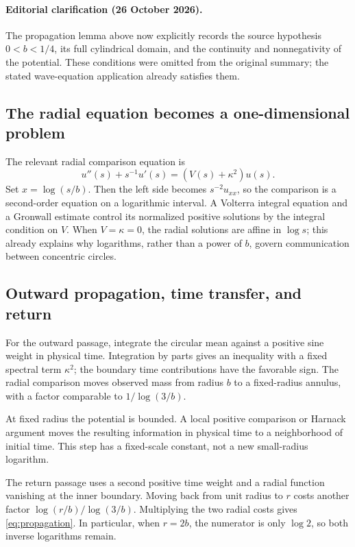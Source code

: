 \documentclass[11pt,a4paper]{article}
\numberwithin{equation}{section}
\theoremstyle{definition}
\theoremstyle{remark}
\begin{document}
\paragraph{Editorial clarification (26 October 2026).} The propagation lemma above now explicitly records the source hypothesis $0<b<1/4$, its full cylindrical domain, and the continuity and nonnegativity of the potential. These conditions were omitted from the original summary; the stated wave-equation application already satisfies them.

\subsection{The radial equation becomes a one-dimensional problem}
The relevant radial comparison equation is
\[
 u''(s)+s^{-1}u'(s)=(V(s)+\kappa^2)u(s).
\]
Set $x=\log(s/b)$. Then the left side becomes $s^{-2}u_{xx}$, so the
comparison is a second-order equation on a logarithmic interval. A Volterra
integral equation and a Gronwall estimate control its normalized positive
solutions by the integral condition on $V$. When $V=\kappa=0$, the radial
solutions are affine in $\log s$; this already explains why logarithms, rather
than a power of $b$, govern communication between concentric circles.

\subsection{Outward propagation, time transfer, and return}
For the outward passage, integrate the circular mean against a positive
sine weight in physical time. Integration by parts gives an inequality with
a fixed spectral term $\kappa^2$; the boundary time contributions have the
favorable sign. The radial comparison moves observed mass from radius $b$
to a fixed-radius annulus, with a factor comparable to
$1/\log(3/b)$.

At fixed radius the potential is bounded. A local positive comparison or
Harnack argument moves the resulting information in physical time to a
neighborhood of initial time. This step has a fixed-scale constant, not a
new small-radius logarithm.

The return passage uses a second positive time weight and a radial function
vanishing at the inner boundary. Moving back from unit radius to $r$ costs
another factor $\log(r/b)/\log(3/b)$. Multiplying the two radial costs gives
\eqref{eq:propagation}. In particular, when $r=2b$, the numerator is only
$\log2$, so both inverse logarithms remain.
\end{document}
